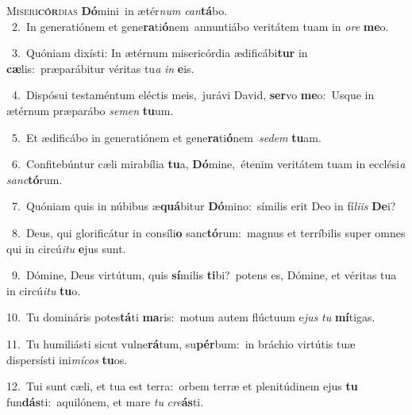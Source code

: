 \lettrine{\initial\textcolor{\initialcolor}{M}}{iseri\-\textbf{cór}\-dias} \textbf{Dó}\-mini~\star in ætér\textit{num} \textit{can}\-\textbf{tá}bo.\\
{\numbfont\textcolor{\numbcolor}{~2.}}~In generatiónem et gene\-\textbf{ra}\-ti\-\textbf{ó}\-nem~\star annuntiábo veritátem tuam in \textit{o}\-\textit{re} \textbf{me}\-o.\par
{\numbfont\textcolor{\numbcolor}{~3.}}~Quóniam dixísti: In ætérnum misericórdia ædificábi\textbf{tur} in \textbf{cæ}\-lis:~\star præparábitur véritas tu\textit{a} \textit{in} \textbf{e}\-is.\par
{\numbfont\textcolor{\numbcolor}{~4.}}~Dispósui testaméntum eléctis meis,~\dagger jurávi David, \textbf{ser}\-vo \textbf{me}\-o:~\star Usque in ætérnum præparábo \textit{se}\-\textit{men} \textbf{tu}\-um.\par
{\numbfont\textcolor{\numbcolor}{~5.}}~Et ædificábo in generatiónem et gene\-\textbf{ra}\-ti\-\textbf{ó}\-nem~\star \textit{se}\-\textit{dem} \textbf{tu}\-am.\par
{\numbfont\textcolor{\numbcolor}{~6.}}~Confitebúntur cæli mirabília \textbf{tu}\-a, \textbf{Dó}\-mine,~\star étenim veritátem tuam in ecclési\textit{a} \textit{sanc}\-\textbf{tó}rum.\par
{\numbfont\textcolor{\numbcolor}{~7.}}~Quóniam quis in núbibus æ\-\textbf{quá}\-bitur \textbf{Dó}\-mino:~\star símilis erit Deo in fí\-\textit{li}\-\textit{is} \textbf{De}\-i?\par
{\numbfont\textcolor{\numbcolor}{~8.}}~Deus, qui glorificátur in consíli\textbf{o} sanc\-\textbf{tó}\-rum:~\star magnus et terríbilis super omnes qui in circú\-\textit{i}\-\textit{tu} \textbf{e}\-jus sunt.\par
{\numbfont\textcolor{\numbcolor}{~9.}}~Dómine, Deus virtútum, quis \textbf{sí}\-milis \textbf{ti}\-bi?~\star potens es, Dómine, et véritas tua in circú\-\textit{i}\-\textit{tu} \textbf{tu}\-o.\par
{\numbfont\textcolor{\numbcolor}{10.}}~Tu domináris potes\-\textbf{tá}\-ti \textbf{ma}\-ris:~\star motum autem flúctuum e\textit{jus} \textit{tu} \textbf{mí}\-tigas.\par
{\numbfont\textcolor{\numbcolor}{11.}}~Tu humiliásti sicut vulne\-\textbf{rá}\-tum, su\-\textbf{pér}\-bum:~\star in bráchio virtútis tuæ dispersísti ini\-\textit{mí}\-\textit{cos} \textbf{tu}\-os.\par
{\numbfont\textcolor{\numbcolor}{12.}}~Tui sunt cæli, et tua est terra:~\dagger orbem terræ et plenitúdinem ejus \textbf{tu} fun\-\textbf{dás}\-ti:~\star aquilónem, et mare \textit{tu} \textit{cre}\-\textbf{ás}ti.\par
